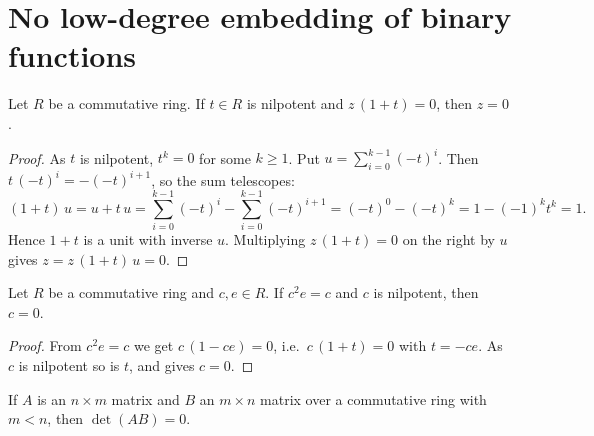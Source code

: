 \section{No low-degree embedding of binary functions}\label{sec:obstruction}

\begin{lemma}\label{lem:nilpotent}
\leanok
Let $R$ be a commutative ring. If $t \in R$ is nilpotent and $z\,(1+t) = 0$, then $z = 0$.
\end{lemma}

\begin{proof}\leanok
As $t$ is nilpotent, $t^{k} = 0$ for some $k \ge 1$. Put $u = \sum_{i=0}^{k-1} (-t)^{i}$.
Then $t\,(-t)^{i} = -(-t)^{i+1}$, so the sum telescopes:
\[
  (1+t)\,u = u + t\,u
           = \sum_{i=0}^{k-1} (-t)^{i} - \sum_{i=0}^{k-1} (-t)^{i+1}
           = (-t)^{0} - (-t)^{k} = 1 - (-1)^{k} t^{k} = 1 .
\]
Hence $1+t$ is a unit with inverse $u$. Multiplying $z\,(1+t) = 0$ on the right by $u$ gives
$z = z\,(1+t)\,u = 0$.
\end{proof}

\begin{lemma}\label{lem:core}
\leanok{}
Let $R$ be a commutative ring and $c, e \in R$. If $c^2 e = c$ and $c$ is nilpotent, then
$c = 0$.
\end{lemma}

\begin{proof}\leanok{}
From $c^2 e = c$ we get $c\,(1 - ce) = 0$, i.e.\ $c\,(1 + t) = 0$ with $t = -ce$. As $c$ is
nilpotent so is $t$, and  gives $c = 0$.
\end{proof}

\begin{lemma}\label{lem:rank}
\leanok
If $A$ is an $n \times m$ matrix and $B$ an $m \times n$ matrix over a commutative ring with
$m < n$, then $\det(AB) = 0$.
\end{lemma}

